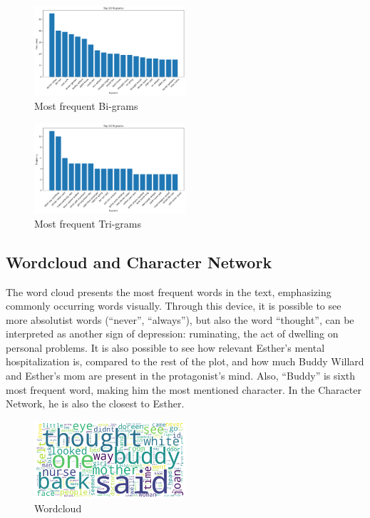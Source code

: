 \documentclass[11pt]{article}
\begin{document}
\begin{figure}[h]
    \centering
    \includegraphics[width=0.5\textwidth]{graph/2grams.png}
    \caption{Most frequent Bi-grams}
    \label{fig:example}
\end{figure}

\begin{figure}[h]
    \centering
    \includegraphics[width=0.5\textwidth]{graph/3grams.png}
    \caption{Most frequent Tri-grams}
    \label{fig:example}
\end{figure}

\subsection{Wordcloud and Character Network}

The word cloud presents the most frequent words in the text, emphasizing commonly occurring words visually.
Through this device, it is possible to see more absolutist words (“never”, “always”), but also the word “thought”, can be interpreted as another sign of depression: ruminating, the act of dwelling on personal problems. It is also possible to see how relevant Esther’s mental hospitalization is, compared to the rest of the plot, and how much Buddy Willard and Esther’s mom are present in the protagonist’s mind. Also, “Buddy” is sixth most frequent word, making him the most mentioned character. In the Character Network, he is also the closest to Esther.

\begin{figure}[h]
    \centering
    \includegraphics[width=0.5\textwidth]{graph/wordcloud.png}
    \caption{Wordcloud}
    \label{fig:example}
\end{figure}
\end{document}
